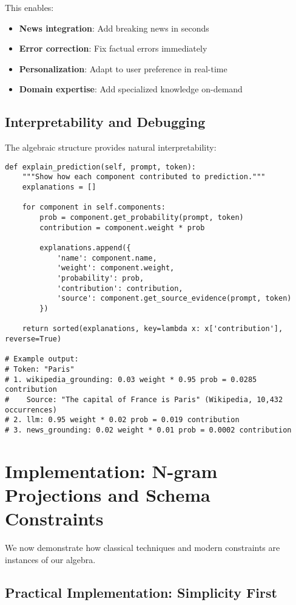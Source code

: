 \documentclass{article}
\theoremstyle{definition}
\begin{document}
This enables:
\begin{itemize}
    \item \textbf{News integration}: Add breaking news in seconds
    \item \textbf{Error correction}: Fix factual errors immediately
    \item \textbf{Personalization}: Adapt to user preference in real-time
    \item \textbf{Domain expertise}: Add specialized knowledge on-demand
\end{itemize}

\subsection{Interpretability and Debugging}

The algebraic structure provides natural interpretability:

\begin{lstlisting}
def explain_prediction(self, prompt, token):
    """Show how each component contributed to prediction."""
    explanations = []

    for component in self.components:
        prob = component.get_probability(prompt, token)
        contribution = component.weight * prob

        explanations.append({
            'name': component.name,
            'weight': component.weight,
            'probability': prob,
            'contribution': contribution,
            'source': component.get_source_evidence(prompt, token)
        })

    return sorted(explanations, key=lambda x: x['contribution'], reverse=True)

# Example output:
# Token: "Paris"
# 1. wikipedia_grounding: 0.03 weight * 0.95 prob = 0.0285 contribution
#    Source: "The capital of France is Paris" (Wikipedia, 10,432 occurrences)
# 2. llm: 0.95 weight * 0.02 prob = 0.019 contribution
# 3. news_grounding: 0.02 weight * 0.01 prob = 0.0002 contribution
\end{lstlisting}

\section{Implementation: N-gram Projections and Schema Constraints}

We now demonstrate how classical techniques and modern constraints are instances of our algebra.

\subsection{Practical Implementation: Simplicity First}
\end{document}
